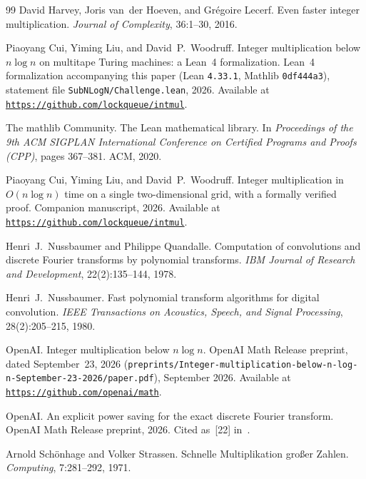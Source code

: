 \documentclass[11pt]{article}
\theoremstyle{definition}
\begin{document}
\begin{thebibliography}{99}
David Harvey, Joris van~der Hoeven, and Gr\'egoire Lecerf.
\newblock Even faster integer multiplication.
\newblock \emph{Journal of Complexity}, 36:1--30, 2016.

Piaoyang Cui, Yiming Liu, and David~P.\ Woodruff.
\newblock Integer multiplication below $n \log n$ on multitape Turing machines: a Lean~4 formalization.
\newblock Lean~4 formalization accompanying this paper (Lean \texttt{4.33.1}, Mathlib \texttt{0df444a3}), statement file \texttt{SubNLogN/Challenge.lean}, 2026.
\newblock Available at \href{https://github.com/lockqueue/intmul}{\texttt{https://github.com/lockqueue/intmul}}.

The mathlib Community.
\newblock The Lean mathematical library.
\newblock In \emph{Proceedings of the 9th ACM SIGPLAN International Conference on Certified Programs and Proofs (CPP)}, pages 367--381. ACM, 2020.

Piaoyang Cui, Yiming Liu, and David~P.\ Woodruff.
\newblock Integer multiplication in $O(n \log n)$ time on a single two-dimensional grid, with a formally verified proof.
\newblock Companion manuscript, 2026.
\newblock Available at \href{https://github.com/lockqueue/intmul}{\texttt{https://github.com/lockqueue/intmul}}.

Henri~J.\ Nussbaumer and Philippe Quandalle.
\newblock Computation of convolutions and discrete Fourier transforms by polynomial transforms.
\newblock \emph{IBM Journal of Research and Development}, 22(2):135--144, 1978.

Henri~J.\ Nussbaumer.
\newblock Fast polynomial transform algorithms for digital convolution.
\newblock \emph{IEEE Transactions on Acoustics, Speech, and Signal Processing}, 28(2):205--215, 1980.

OpenAI.
\newblock Integer multiplication below $n \log n$.
\newblock OpenAI Math Release preprint, dated September~23, 2026 (\texttt{preprints/Integer-multiplication-below-n-log-n-September-23-2026/paper.pdf}), September 2026.
\newblock Available at \href{https://github.com/openai/math}{\texttt{https://github.com/openai/math}}.

OpenAI.
\newblock An explicit power saving for the exact discrete Fourier transform.
\newblock OpenAI Math Release preprint, 2026. Cited as~[22] in~\cite{OAI26}.

Arnold Sch\"onhage and Volker Strassen.
\newblock Schnelle Multiplikation gro\ss er Zahlen.
\newblock \emph{Computing}, 7:281--292, 1971.

\end{thebibliography}
\end{document}
